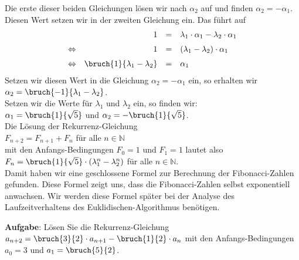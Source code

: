 Die erste dieser beiden Gleichungen l\"{o}sen wir nach $\alpha_2$ auf und finden  $\alpha_2 = - \alpha_1$.
Diesen Wert setzen wir in der zweiten Gleichung ein.  Das f\"{u}hrt auf
\[
\begin{array}{lrcl}
                 & 1 & = & \lambda_1 \cdot \alpha_1 - \lambda_2 \cdot \alpha_1 \\[0.2cm]
 \Leftrightarrow & 1 & = & (\lambda_1 - \lambda_2) \cdot \alpha_1              \\[0.2cm]
 \Leftrightarrow & \bruch{1}{\lambda_1 - \lambda_2} & = & \alpha_1 
\end{array}
\]
Setzen wir diesen Wert in die Gleichung $\alpha_2 = - \alpha_1$ ein, so erhalten wir \\[0.2cm]
\hspace*{1.3cm} 
  $\alpha_2 = \bruch{- 1}{\lambda_1 - \lambda_2}$.
\\[0.2cm]
Setzen wir die  Werte f\"{u}r $\lambda_1$ und $\lambda_2$ ein, so finden wir:  \\[0.2cm]
\hspace*{1.3cm} 
$\alpha_1 = \bruch{1}{\sqrt{5}}$ \quad und \quad $\alpha_2 = - \bruch{1}{\sqrt{5}}$.
\\[0.2cm]
Die L\"{o}sung der Rekurrenz-Gleichung \\[0.2cm]
\hspace*{1.3cm} $F_{n+2} = F_{n+1} + F_{n}$ \quad f\"{u}r alle $n \in \mathbb{N}$ \\[0.2cm]
mit den Anfangs-Bedingungen $F_0 = 1$ und $F_1 = 1$   lautet also 
\\[0.2cm]
\hspace*{1.3cm} 
$F_n = \bruch{1}{\sqrt{5}}\cdot \left( \lambda_1^{n} - \lambda_2^{n} \right)$ 
\quad f\"{u}r alle $n \in \mathbb{N}$.  
\\[0.2cm]
Damit haben wir eine geschlossene Formel zur Berechnung der Fibonacci-Zahlen
gefunden.  Diese Formel zeigt uns, dass die Fibonacci-Zahlen selbst exponentiell anwachsen.
Wir werden diese Formel sp\"{a}ter bei der Analyse des Laufzeitverhaltens des
Euklidischen-Algorithmus ben\"{o}tigen. 

\vspace*{0.2cm}
\noindent
\textbf{Aufgabe}:  L\"{o}sen Sie die Rekurrenz-Gleichung 
$a_{n+2} = \bruch{3}{2} \cdot a_{n+1} - \bruch{1}{2}\cdot a_n$ mit
den Anfangs-Bedingungen $a_0 = 3$ und $a_1 = \bruch{5}{2}$.


